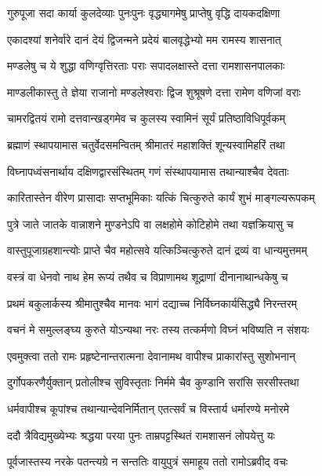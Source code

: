 \twolineshloka
{गुरुपूजा सदा कार्या कुलदेव्याः पुनःपुनः}
{वृद्ध्यागमेषु प्राप्तेषु वृद्धि दायकदक्षिणा}%

\twolineshloka
{एकादश्यां शनेर्वारे दानं देयं द्विजन्मने}
{प्रदेयं बालवृद्धेभ्यो मम रामस्य शासनात्}%

\twolineshloka
{मण्डलेषु च ये शुद्धा वणिग्वृत्तिरताः पराः}
{सपादलक्षास्ते दत्ता रामशासनपालकाः}%

\twolineshloka
{माण्डलीकास्तु ते ज्ञेया राजानो मण्डलेश्वराः}
{द्विज शुश्रूषणे दत्ता रामेण वणिजां वराः}%

\twolineshloka
{चामरद्वितयं रामो दत्तवान्खड्गमेव च}
{कुलस्य स्वामिनं सूर्यं प्रतिष्ठाविधिपूर्वकम्}%

\twolineshloka
{ब्रह्माणं स्थापयामास चतुर्वेदसमन्वितम्}
{श्रीमातरं महाशक्तिं शून्यस्वामिहरिं तथा}%

\twolineshloka
{विघ्नापध्वंसनार्थाय दक्षिणद्वारसंस्थितम्}
{गणं संस्थापयामास तथान्याश्चैव देवताः}%

\twolineshloka
{कारितास्तेन वीरेण प्रासादाः सप्तभूमिकाः}
{यत्किं चित्कुरुते कार्यं शुभं माङ्गल्यरूपकम्}%

\twolineshloka
{पुत्रे जाते जातके वान्नाशने मुण्डनेऽपि वा}
{लक्षहोमे कोटिहोमे तथा यज्ञक्रियासु च}%

\twolineshloka
{वास्तुपूजाग्रहशान्त्योः प्राप्ते चैव महोत्सवे}
{यत्किञ्चित्कुरुते दानं द्रव्यं वा धान्यमुत्तमम्}%

\twolineshloka
{वस्त्रं वा धेनवो नाथ हेम रूप्यं तथैव च}
{विप्राणामथ शूद्राणां दीनानाथान्धकेषु च}%

\twolineshloka
{प्रथमं बकुलार्कस्य श्रीमातुश्चैव मानवः}
{भागं दद्याच्च निर्विघ्नकार्यसिद्ध्यै निरन्तरम्}%

\twolineshloka
{वचनं मे समुल्लङ्घ्य कुरुते योऽन्यथा नरः}
{तस्य तत्कर्मणो विघ्नं भविष्यति न संशयः}%

\twolineshloka
{एवमुक्त्वा ततो रामः प्रहृष्टेनान्तरात्मना}
{देवानामथ वापीश्च प्राकारांस्तु सुशोभनान्}%

\twolineshloka
{दुर्गोपकरणैर्युक्तान् प्रतोलीश्च सुविस्तृताः}
{निर्ममे चैव कुण्डानि सरांसि सरसीस्तथा}%

\twolineshloka
{धर्मवापीश्च कूपांश्च तथान्यान्देवनिर्मितान्}
{एतत्सर्वं च विस्तार्य धर्मारण्ये मनोरमे}%

\twolineshloka
{ददौ त्रैविद्यमुख्येभ्यः श्रद्धया परया पुनः}
{ताम्रपट्टस्थितं रामशासनं लोपयेत्तु यः}%

\twolineshloka
{पूर्वजास्तस्य नरके पतन्त्यग्रे न सन्ततिः}
{वायुपुत्रं समाहूय ततो रामोऽब्रवीद् वचः}%

